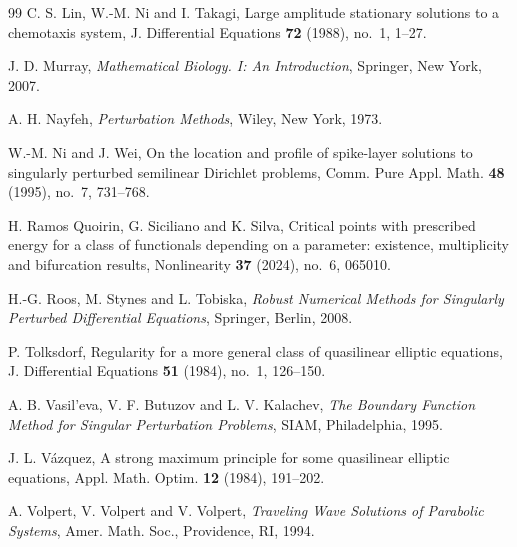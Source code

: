 \documentclass[preprint,11pt]{elsarticle}
\numberwithin{equation}{section}
\begin{document}
\begin{thebibliography}{99}
	C. S. Lin, W.-M. Ni and I. Takagi,
	Large amplitude stationary solutions to a chemotaxis system,
	J. Differential Equations \textbf{72} (1988), no.~1, 1--27.
	
	J. D. Murray,
	\textit{Mathematical Biology. I: An Introduction},
	Springer, New York, 2007.
	
	A. H. Nayfeh,
	\textit{Perturbation Methods},
	Wiley, New York, 1973.
	
	W.-M. Ni and J. Wei,
	On the location and profile of spike-layer solutions to singularly perturbed
	semilinear Dirichlet problems,
	Comm. Pure Appl. Math. \textbf{48} (1995), no.~7, 731--768.
	
	H. Ramos Quoirin, G. Siciliano and K. Silva,
	Critical points with prescribed energy for a class of functionals depending on
	a parameter: existence, multiplicity and bifurcation results,
	Nonlinearity \textbf{37} (2024), no.~6, 065010.
	
	H.-G. Roos, M. Stynes and L. Tobiska,
	\textit{Robust Numerical Methods for Singularly Perturbed Differential Equations},
	Springer, Berlin, 2008.
	
	P. Tolksdorf,
	Regularity for a more general class of quasilinear elliptic equations,
	J. Differential Equations \textbf{51} (1984), no.~1, 126--150.
	
	A. B. Vasil'eva, V. F. Butuzov and L. V. Kalachev,
	\textit{The Boundary Function Method for Singular Perturbation Problems},
	SIAM, Philadelphia, 1995.
	
	J. L. V\'azquez,
	A strong maximum principle for some quasilinear elliptic equations,
	Appl. Math. Optim. \textbf{12} (1984), 191--202.
	
	A. Volpert, V. Volpert and V. Volpert,
	\textit{Traveling Wave Solutions of Parabolic Systems},
	Amer. Math. Soc., Providence, RI, 1994.
	
\end{thebibliography}
\end{document}
